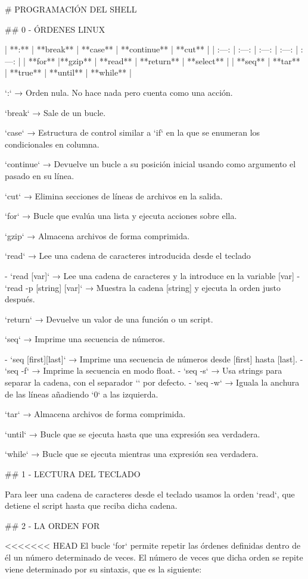 # PROGRAMACIÓN DEL SHELL

## 0 - ÓRDENES LINUX

| **:** | **break** | **case** | **continue** | **cut** |
| :---: | :---: | :---: | :---: | :---: |
| **for** |**gzip** | **read** | **return** | **select** |
| **seq** | **tar** | **true** | **until** | **while** |

`:` → Orden nula. No hace nada pero cuenta como una acción.

`break` → Sale de un bucle.

`case` → Estructura de control similar a `if` en la que se enumeran los condicionales en columna.

`continue` → Devuelve un bucle a su posición inicial usando como argumento el pasado en su línea.

`cut`  → Elimina secciones de líneas de archivos en la salida. 

`for` → Bucle que evalúa una lista y ejecuta acciones sobre ella.

`gzip` → Almacena archivos de forma comprimida.

`read` → Lee una cadena de caracteres introducida desde el teclado

- `read [var]` → Lee una cadena de caracteres y la introduce en la variable [var]
- `read -p [string] [var]` → Muestra la cadena [string] y ejecuta la orden justo después.

`return` → Devuelve un valor de una función o un script.

`seq` → Imprime una secuencia de números.

- `seq [first][last]` → Imprime una secuencia de números desde [first] hasta [last].
- `seq -f` → Imprime la secuencia en modo float.
- `seq -s` → Usa strings para separar la cadena, con el separador `\n` por defecto.
- `seq -w` → Iguala la anchura de las líneas añadiendo `0` a las izquierda.

`tar` → Almacena archivos de forma comprimida.

`until` → Bucle que se ejecuta hasta que una expresión sea verdadera.

`while` → Bucle que se ejecuta mientras una expresión sea verdadera.

## 1 - LECTURA DEL TECLADO

Para leer una cadena de caracteres desde el teclado usamos la orden `read`, que detiene el script hasta que reciba dicha cadena.

## 2 - LA ORDEN FOR

<<<<<<< HEAD
El bucle `for` permite repetir las órdenes definidas dentro de él un número determinado de veces. El número de veces que dicha orden se repite viene determinado por su sintaxis, que es la siguiente:

